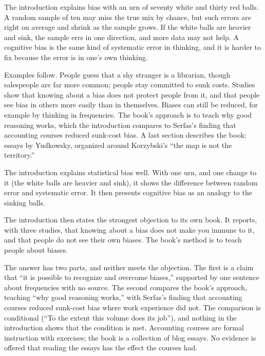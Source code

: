 \begin{afterword}
\summaryhead

The introduction explains bias with an urn of seventy white and thirty red balls. A random sample of ten may miss the true mix by chance, but such errors are right on average and shrink as the sample grows. If the white balls are heavier and sink, the sample errs in one direction, and more data may not help. A cognitive bias is the same kind of systematic error in thinking, and it is harder to fix because the error is in one's own thinking.

Examples follow. People guess that a shy stranger is a librarian, though salespeople are far more common; people stay committed to sunk costs. Studies show that knowing about a bias does not protect people from it, and that people see bias in others more easily than in themselves. Biases can still be reduced, for example by thinking in frequencies. The book's approach is to teach why good reasoning works, which the introduction compares to Serfas's finding that accounting courses reduced sunk-cost bias. A last section describes the book: essays by Yudkowsky, organized around Korzybski's ``the map is not the territory.''

\responsehead

The introduction explains statistical bias well. With one urn, and one change to it (the white balls are heavier and sink), it shows the difference between random error and systematic error. It then presents cognitive bias as an analogy to the sinking balls.

The introduction then states the strongest objection to its own book. It reports, with three studies, that knowing about a bias does not make you immune to it, and that people do not see their own biases. The book's method is to teach people about biases.

The answer has two parts, and neither meets the objection. The first is a claim that ``it is possible to recognize and overcome biases,'' supported by one sentence about frequencies with no source. The second compares the book's approach, teaching ``why good reasoning works,'' with Serfas's finding that accounting courses reduced sunk-cost bias where work experience did not. The comparison is conditional (``To the extent this volume does its job''), and nothing in the introduction shows that the condition is met. Accounting courses are formal instruction with exercises; the book is a collection of blog essays. No evidence is offered that reading the essays has the effect the courses had.


\end{afterword}
